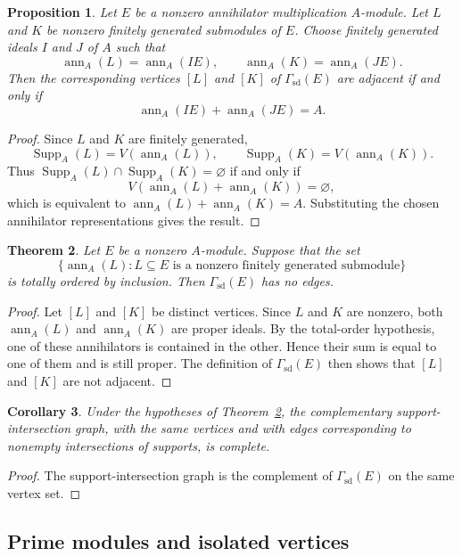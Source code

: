 \documentclass[11pt]{amsart}
\theoremstyle{plain}
\newtheorem{theorem}{Theorem}[section]
\newtheorem{proposition}[theorem]{Proposition}
\newtheorem{corollary}[theorem]{Corollary}
\theoremstyle{definition}
\theoremstyle{remark}
\DeclareMathOperator{\Supp}{Supp}
\newcommand{\ann}{\operatorname{ann}}
\newcommand{\GammaSD}{\Gamma_{\mathrm{sd}}}
\numberwithin{equation}{section}
\begin{document}
\begin{proposition}
\label{prop:graph-test}
Let $E$ be a nonzero annihilator multiplication $A$-module. Let $L$
and $K$ be nonzero finitely generated submodules of $E$. Choose finitely
generated ideals $I$ and $J$ of $A$ such that
\[
\ann_A(L)=\ann_A(IE),\qquad \ann_A(K)=\ann_A(JE).
\]
Then the corresponding vertices $[L]$ and $[K]$ of $\GammaSD(E)$ are adjacent
if and only if
\[
\ann_A(IE)+\ann_A(JE)=A.
\]
\end{proposition}

\begin{proof}
Since $L$ and $K$ are finitely generated,
\[
\Supp_A(L)=V(\ann_A(L)),\qquad \Supp_A(K)=V(\ann_A(K)).
\]
Thus $\Supp_A(L)\cap\Supp_A(K)=\varnothing$ if and only if
\[
V(\ann_A(L)+\ann_A(K))=\varnothing,
\]
which is equivalent to $\ann_A(L)+\ann_A(K)=A$. Substituting the chosen
annihilator representations gives the result.
\end{proof}

\begin{theorem}
\label{thm:graph-edgeless}
Let $E$ be a nonzero $A$-module. Suppose
that the set
\[
\{\ann_A(L):L\subseteq E\text{ is a nonzero finitely generated submodule}\}
\]
is totally ordered by inclusion. Then $\GammaSD(E)$ has no edges.
\end{theorem}

\begin{proof}
Let $[L]$ and $[K]$ be distinct vertices. Since $L$ and $K$ are nonzero, both
$\ann_A(L)$ and $\ann_A(K)$ are proper ideals. By the total-order hypothesis,
one of these annihilators is contained in the other. Hence their sum is equal
to one of them and is still proper. The definition of $\GammaSD(E)$ then
shows that $[L]$ and $[K]$ are not adjacent.
\end{proof}

\begin{corollary}
Under the hypotheses of Theorem~\ref{thm:graph-edgeless}, the complementary
support-intersection graph, with the same vertices and with edges corresponding
to nonempty intersections of supports, is complete.
\end{corollary}

\begin{proof}
The support-intersection graph is the complement of $\GammaSD(E)$ on the same
vertex set.
\end{proof}

\subsection{Prime modules and isolated vertices}
\end{document}
